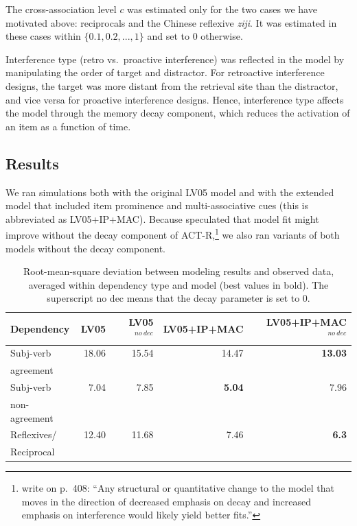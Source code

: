 \documentclass{cambridge7A}\usepackage[]{graphicx}\usepackage[]{color}
\begin{document}
The cross-association level $c$ was estimated only for the two cases we have motivated above: reciprocals and the Chinese reflexive \emph{ziji}. It was estimated in these cases within $\{0.1, 0.2, ..., 1\}$ and set to $0$ otherwise.

Interference type (retro vs.\ proactive interference) was reflected in the model by manipulating the order of target and distractor. For  retroactive interference designs, the target was more distant from the retrieval site than the distractor, and vice versa for  proactive interference designs. Hence, interference type affects the model through the memory decay component, which reduces the activation of an item as a function of time.

\subsection{Results}
We ran simulations both with the original LV05 model and with the extended model that included item  prominence and  multi-associative cues (this is abbreviated as LV05+IP+MAC).
Because \cite{LewisVasishth2005} speculated that model fit might improve without the decay component of ACT-R,\footnote{
    \cite{LewisVasishth2005} write on p.\ 408: ``Any structural or quantitative change to the model that moves in the direction of decreased emphasis on decay and increased emphasis on interference would likely yield better fits.''}
we also ran variants of both models without the decay component.



\begin{table}[!htbp]
\centering
\begin{tabular}{lrrrr}
Dependency & LV05 & LV05$^{no\ dec}$ & LV05+IP+MAC & LV05+IP+MAC$^{no\ dec}$ \\ 
\hline
Subj-verb & 18.06 & 15.54 & 14.47 & \textbf{13.03} \\ 
agreement & & & & \\
  Subj-verb & 7.04 & 7.85 & \textbf{5.04} & 7.96 \\ 
non-agreement & & & & \\
  Reflexives/ & 12.40 & 11.68 & 7.46 & \textbf{6.3} \\ 
Reciprocal & & & & \\  
\hline
\end{tabular}
\caption{Root-mean-square deviation between modeling results and observed data, averaged within dependency type and model (best values in bold). The superscript no dec means that the decay parameter is set to 0.} \label{tab:simfit}
\end{table}
\end{document}
